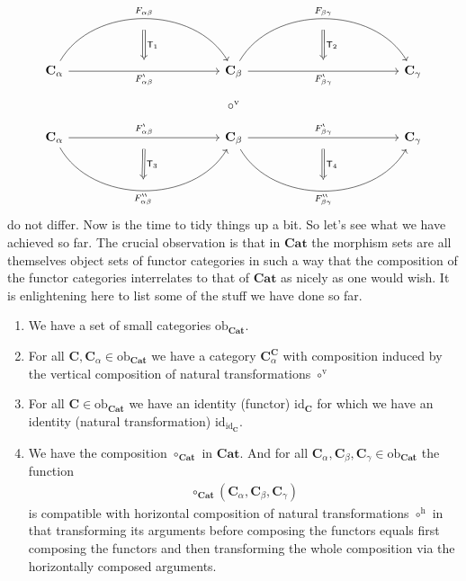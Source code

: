 \[
\begin{tikzcd}[row sep=huge, column sep=6em]
  \mathbf{C}_{\alpha}
  \arrow[bend left=60]{rr}[name=fab]{F_{\alpha\beta}}
  \arrow[swap]{rr}[name=fab*1]{F_{\alpha\beta}^{\backprime}}
  &
  &
  \mathbf{C}_{\beta}
  \arrow[bend left=60]{rr}[name=fbc]{F_{\beta\gamma}}
  \arrow[swap]{rr}[name=fbc*1]{F_{\beta\gamma}^{\backprime}}
  \arrow[phantom]{d}{\circ^{\textrm{v}}}
  &
  &
  \mathbf{C}_{\gamma}
  \\
  \mathbf{C}_{\alpha}
  \arrow{rr}[name=fab*2]{F_{\alpha\beta}^{\backprime}}
  \arrow[bend right=60,swap]{rr}[name=fab**]{F_{\alpha\beta}^{\backprime\backprime}}
  &
  &
  \mathbf{C}_{\beta}
  \arrow{rr}[name=fbc*2]{F_{\beta\gamma}^{\backprime}}
  \arrow[bend right=60,swap]{rr}[name=fbc**]{F_{\beta\gamma}^{\backprime\backprime}}
  &
  &
  \mathbf{C}_{\gamma}
  \arrow[from=fab,to=fab*1,shorten <= 9pt,shorten >= 9pt,Rightarrow]{d}{\mathsf{T}_{1}}
  \arrow[from=fab*2,to=fab**,shorten <= 9pt,shorten >= 9pt,Rightarrow]{d}{\mathsf{T}_{3}}
  \arrow[from=fbc,to=fbc*1,shorten <= 9pt,shorten >= 9pt,Rightarrow]{d}{\mathsf{T}_{2}}
  \arrow[from=fbc*2,to=fbc**,shorten <= 9pt,shorten >= 9pt,Rightarrow]{d}{\mathsf{T}_{4}}
\end{tikzcd}
\]
do not differ.
Now is the time to tidy things up a bit.
So let's see what we have achieved so far.
The crucial observation is that in $\mathbf{Cat}$ the morphism sets are all themselves object sets of functor categories in such a way that the composition of the functor categories interrelates to that of $\mathbf{Cat}$ as nicely as one would wish.
It is enlightening here to list some of the stuff we have done so far.
\begin{enumerate}
\item[(1)]
We have a set of small categories $\mathrm{ob}_{\mathbf{Cat}}$.
\item[(2)]
For all $\mathbf{C},\mathbf{C}_{\alpha} \in \mathrm{ob}_{\mathbf{Cat}}$ we have a category $\mathbf{C}_{\alpha}^{\mathbf{C}}$ with composition induced by the vertical composition of natural transformations $\circ^{\textrm{v}}$
\item[(3)]
For all $\mathbf{C} \in \mathrm{ob}_{\mathbf{Cat}}$ we have an identity (functor) $\mathrm{id}_{\mathbf{C}}$ for which we have an identity (natural transformation) $\mathrm{id}_{\mathrm{id}_{\mathbf{C}}}$.
\item[(4)]
We have the composition $\circ_{\mathbf{Cat}}$ in $\mathbf{Cat}$.
And for all $\mathbf{C}_{\alpha},\mathbf{C}_{\beta},\mathbf{C}_{\gamma} \in \mathrm{ob}_{\mathbf{Cat}}$ the function
\begin{align*}
  \circ_{\mathbf{Cat}}
  (\mathbf{C}_{\alpha},\mathbf{C}_{\beta},\mathbf{C}_{\gamma})
\end{align*}
is compatible with horizontal composition of natural transformations $\circ^{\textrm{h}}$ in that transforming its arguments before composing the functors equals first composing the functors and then transforming the whole composition via the horizontally composed arguments.
\end{enumerate}

